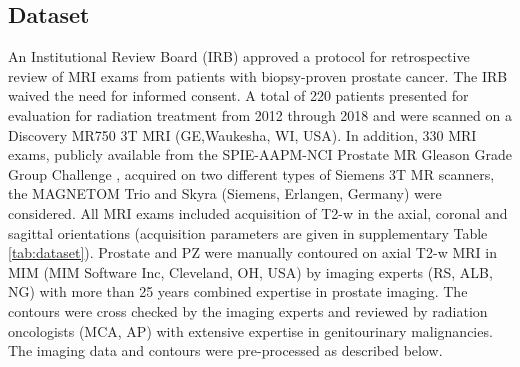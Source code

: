 \subsection{Dataset}
\label{subsec:dataset}
 An Institutional Review Board (IRB) approved a protocol for retrospective review of MRI exams from patients with biopsy-proven prostate cancer. The IRB waived the need for informed consent. A total of 220 patients presented for evaluation for radiation treatment from 2012 through 2018 and were scanned on a Discovery MR750 3T MRI (GE,Waukesha, WI, USA). In addition, 330 MRI exams, publicly available from the SPIE-AAPM-NCI Prostate MR Gleason Grade Group Challenge \cite{pro2}, acquired on two different types of Siemens 3T MR scanners, the MAGNETOM Trio and Skyra (Siemens, Erlangen, Germany) were considered. All MRI exams included acquisition of T2-w in the axial, coronal and sagittal orientations (acquisition parameters are given in supplementary Table \ref{tab:dataset}).
Prostate and PZ were manually contoured on axial T2-w MRI in MIM (MIM Software Inc, Cleveland, OH, USA) by imaging experts (RS, ALB, NG) with more than 25 years combined expertise in prostate imaging. The contours were cross checked by the imaging experts and reviewed by radiation oncologists (MCA, AP) with extensive expertise in genitourinary malignancies.
The imaging data and contours were pre-processed as described below.
